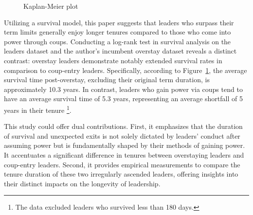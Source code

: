 \documentclass[
  12pt,
  a4paper,
  12pt]{article}
\begin{document}
\begin{figure}


\caption{\label{fig-logrank}Kaplan-Meier plot}

\end{figure}%

Utilizing a survival model, this paper suggests that leaders who surpass
their term limits generally enjoy longer tenures compared to those who
come into power through coups. Conducting a log-rank test in survival
analysis on the leaders dataset \citep{goemans2009} and the author's
incumbent overstay dataset reveals a distinct contrast: overstay leaders
demonstrate notably extended survival rates in comparison to coup-entry
leaders. Specifically, according to Figure~\ref{fig-logrank}, the
average survival time post-overstay, excluding their original term
duration, is approximately 10.3 years. In contrast, leaders who gain
power via coups tend to have an average survival time of 5.3 years,
representing an average shortfall of 5 years in their tenure
\footnote{The data excluded leaders who survived less than 180 days.}.

This study could offer dual contributions. First, it emphasizes that the
duration of survival and unexpected exits is not solely dictated by
leaders' conduct after assuming power but is fundamentally shaped by
their methods of gaining power. It accentuates a significant difference
in tenures between overstaying leaders and coup-entry leaders. Second,
it provides empirical measurements to compare the tenure duration of
these two irregularly ascended leaders, offering insights into their
distinct impacts on the longevity of leadership.
\end{document}
